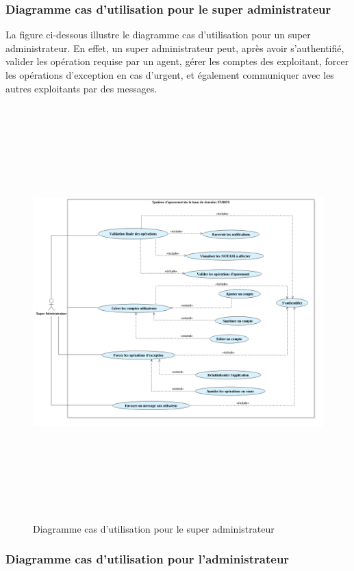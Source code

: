 \subsubsection{Diagramme cas d'utilisation pour le super administrateur}
La figure ci-dessous illustre le diagramme cas d'utilisation pour un super administrateur. En effet, un super administrateur peut, après avoir s'authentifié, valider les opération requise par un agent, gérer les comptes des exploitant, forcer les opérations d'exception en cas d'urgent, et également communiquer avec les autres exploitants par des messages.
\begin{figure}[!h]
\begin{center}
\includegraphics[width=18cm,height=16cm]{besoins/super_administrateur.png}
\end{center}
\caption{Diagramme cas d'utilisation pour le super administrateur}
\end{figure}


\subsubsection{Diagramme cas d'utilisation pour l'administrateur}

